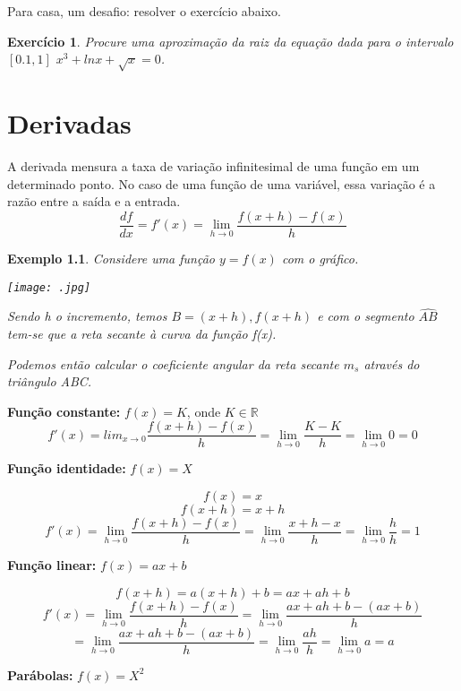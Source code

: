 \documentclass{book}
\numberwithin{defn}{chapter}
\newtheorem{exe}{Exemplo}
\numberwithin{exe}{chapter}
\newtheorem{ex}{Exercício}
\numberwithin{ex}{chapter}
\numberwithin{obs}{chapter}
\numberwithin{fato}{chapter}
\numberwithin{resp}{chapter}
\begin{document}
Para casa, um desafio: resolver o exercício abaixo.
\begin{ex}
    Procure uma aproximação da raiz da equação dada para o intervalo $[0.1,1]$ $x^3+lnx+\sqrt{x}=0$.
\end{ex}


\chapter{Derivadas} %
A derivada mensura a taxa de variação infinitesimal de uma função em um determinado ponto. No caso de uma função de uma variável, essa variação é a razão entre a saída e a entrada.
\[\frac{df}{dx} = f'(x) = \lim_{h \to 0} \frac{f(x+h) - f(x)}{h}\]


\begin{exe}
    Considere uma função $y=f(x)$ com o gráfico.
    
\begin{center}\texttt{[image: .jpg]}\end{center}

Sendo h o incremento, temos $B=(x+h),f(x+h)$ e com o segmento $\widehat{AB}$ tem-se que a reta secante à curva da função f(x).

Podemos então calcular o coeficiente angular da reta secante $m_s$ através do triângulo ABC.
\[\]

\end{exe}


\textbf{Função constante:} \(f(x) = K\), onde \(K \in \mathbb{R}\)
\[f'(x) = lim_{x \to 0} \frac{f(x+h) - f(x)}{h} = \lim_{h \to 0} \frac{K - K}{h} = \lim_{h \to 0} 0 = 0\]

\textbf{Função identidade:} \(f(x) = X\)

\[f(x) = x\] 
\[f(x + h) = x + h\]
\[f'(x) = \lim_{h \to 0} \frac{f(x + h) - f(x)}{h} = \lim_{h \to 0} \frac{x + h - x}{h} = \lim_{h \to 0} \frac{h}{h} = 1\]

\textbf{Função linear:} \(f(x) = ax + b\)

\[f(x+h) = a(x + h) + b = ax + ah + b\]
\[f'(x) = \lim_{h \to 0} \frac{f(x + h) - f(x)}{h} = \lim_{h \to 0} \frac{ax + ah + b - (ax + b)}{h}\]
\[= \lim_{h \to 0} \frac{ax + ah + b - (ax + b)}{h} = \lim_{h \to 0} \frac{ah}{h} = \lim_{h \to 0} a = a\]

\textbf{Parábolas:} \(f(x) = X^2\)
\end{document}
